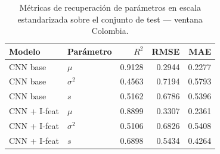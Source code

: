 \begin{table}[ht!]
\centering
\caption{M\'etricas de recuperaci\'on de par\'ametros en escala estandarizada
sobre el conjunto de test — ventana Colombia.}
\label{tab:metrics_final}
\begin{tabular}{llrrr}
\hline
Modelo & Par\'ametro & $R^2$ & RMSE & MAE \\
\hline
CNN base & $\mu$ & 0.9128 & 0.2944 & 0.2277 \\
CNN base & $\sigma^2$ & 0.4563 & 0.7194 & 0.5793 \\
CNN base & $s$ & 0.5162 & 0.6786 & 0.5396 \\
\hline
CNN + I-feat & $\mu$ & 0.8899 & 0.3307 & 0.2361 \\
CNN + I-feat & $\sigma^2$ & 0.5106 & 0.6826 & 0.5408 \\
CNN + I-feat & $s$ & 0.6898 & 0.5434 & 0.4264 \\
\hline
\end{tabular}
\end{table}
